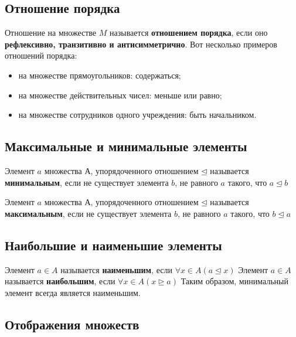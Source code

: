 \documentclass[a4paper]{article}
\begin{document}
    \subsection*{Отношение порядка}
    Отношение на множестве $M$ называется \textbf{отношением
    порядка}, если оно \textbf{рефлексивно, транзитивно и антисимметрично}.
    Вот несколько примеров отношений порядка:
    \begin{itemize}
        \item на множестве прямоугольников: содержаться;
        \item на множестве действительных чисел: меньше или равно;
        \item на множестве сотрудников одного учреждения: быть начальником.
    \end{itemize}

    \subsection*{Максимальные и минимальные элементы}
    Элемент $a$ множества $А$, упорядоченного отношением $\unlhd$ называется \textbf{минимальным}, если не существует элемента $b$, не равного $a$ такого, что $a \unlhd b$\newline

    Элемент $a$ множества $А$, упорядоченного отношением $\unlhd$ называется \textbf{максимальным}, если не существует элемента $b$, не равного $a$ такого, что $b \unlhd a$

    \subsection*{Наибольшие и наименьшие элементы
    }
    Элемент $a \in A$ называется \textbf{наименьшим}, если $\forall x \in A (a \unlhd x)$\newline
    Элемент $a \in A$ называется \textbf{наибольшим}, если $\forall x \in A (x \unrhd a)$\newline
    Таким образом, минимальный элемент всегда является наименьшим.

    \newpage \begin{center}
                 \begin{Large}
                 \end{Large}
    \end{center}

    \subsection*{Отображения множеств
    }
\end{document}
